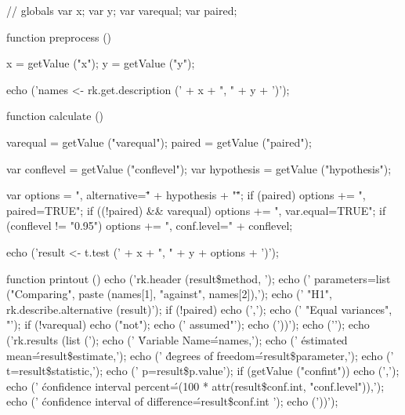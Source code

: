 \begin{footnotesize}
\begin{Code}
// globals
var x;
var y;
var varequal;
var paired;

function preprocess () {
  x = getValue ("x");
  y = getValue ("y");

  echo ('names <- rk.get.description (' + x + ", " + y + ')\n');
}

function calculate () {
  varequal = getValue ("varequal");
  paired = getValue ("paired");

  var conflevel = getValue ("conflevel");
  var hypothesis = getValue ("hypothesis");

  var options = ", alternative=\"" + hypothesis + "\"";
  if (paired) options += ", paired=TRUE";
  if ((!paired) && varequal) options += ", var.equal=TRUE";
  if (conflevel != "0.95") options += ", conf.level=" + conflevel;

  echo ('result <- t.test (' + x + ", " + y + options + ')\n');
}

function printout () {
  echo ('rk.header (result\$method, \n');
  echo ('  parameters=list ("Comparing", paste (names[1], "against", names[2]),\n');
  echo ('  "H1", rk.describe.alternative (result)');
  if (!paired) {
    echo (',\n');
    echo ('  "Equal variances", "');
    if (!varequal) echo ("not");
    echo (' assumed"');
  }
  echo ('))\n');
  echo ('\n');
  echo ('rk.results (list (\n');
  echo ('  \'Variable Name\'=names,\n');
  echo ('  \'estimated mean\'=result\$estimate,\n');
  echo ('  \'degrees of freedom\'=result\$parameter,\n');
  echo ('  t=result\$statistic,\n');
  echo ('  p=result\$p.value');
  if (getValue ("confint")) {
    echo (',\n');
    echo ('  \'confidence interval percent\'=(100 * attr(result\$conf.int, "conf.level")),\n');
    echo ('  \'confidence interval of difference\'=result\$conf.int ');
  }
  echo ('))\n');
}
\end{Code}
\end{footnotesize}

